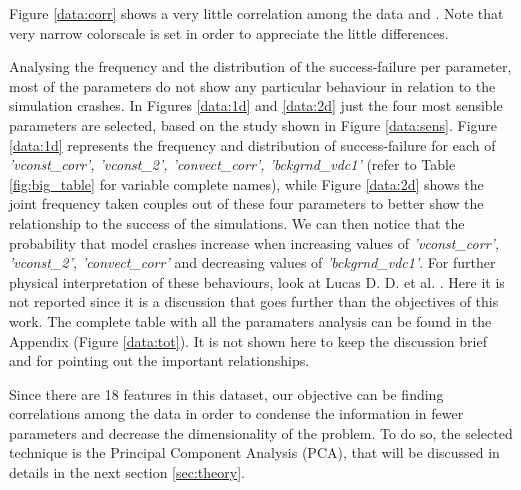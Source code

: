 \documentclass[english,notitlepage,reprint,nofootinbib]{revtex4-1}  %
\begin{document}
Figure \ref{data:corr} shows a very little correlation among the data and . Note that very narrow colorscale is set in order to appreciate the little differences.

Analysing the frequency and the distribution of the success-failure per parameter, most of the parameters do not show any particular behaviour in relation to the simulation crashes. In Figures \ref{data:1d} and \ref{data:2d} just the four most sensible parameters are selected, based on the study \cite{failure} shown in Figure \ref{data:sens}. Figure \ref{data:1d} represents the frequency and distribution of success-failure for each of \textit{'vconst\_corr', 'vconst\_2', 'convect\_corr', 'bckgrnd\_vdc1'} (refer to Table \ref{fig:big_table} for variable complete names), while Figure \ref{data:2d} shows the joint frequency taken couples out of these four parameters to better show the relationship to the success of the simulations. We can then notice that the probability that model crashes increase when increasing values of \textit{'vconst\_corr', 'vconst\_2', 'convect\_corr'} and decreasing values of \textit{'bckgrnd\_vdc1'}. For further physical interpretation of these behaviours, look at Lucas D. D. et al. \cite{failure}. Here it is not reported since it is a discussion that goes further than the objectives of this work. The complete table with all the paramaters analysis can be found in the Appendix (Figure \ref{data:tot}). It is not shown here to keep the discussion brief and for pointing out the important relationships. 

Since there are 18 features in this dataset, our objective can be finding correlations among the data in order to condense the information in fewer parameters and decrease the dimensionality of the problem. To do so, the selected technique is the Principal Component Analysis (PCA), that will be discussed in details in the next section \ref{sec:theory}.
\end{document}
